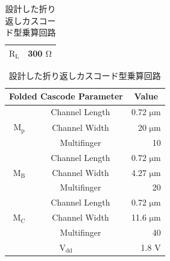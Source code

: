 \begin{table}[!b]
\begin{minipage}[t]{.45\textwidth}
\begin{center}
\begin{tabular}{c|c|r}
                        \multicolumn{2}{c|}{$\mathrm{R_{L}}$} &   300 $\mathrm{\Omega}$   \\
                        \hline
                    \end{tabular}
                \end{center}                
            \end{minipage}
            \hfill
            \begin{minipage}[t]{.45\textwidth}
                \begin{center}
                    \caption{設計した折り返しカスコード型乗算回路}
                    \label{table:3_folded_gilbert_param}
                    \begin{tabular}{c|c|r}
                            \hline
                            \multicolumn{2}{c|}{Folded Cascode Parameter}   & \multicolumn{1}{c}{Value}     \\
                            \hline\hline
                            &   Channel Length   &   0.72 $\mathrm{\mu m}$   \\
                            \cline{2-3}
                            $\mathrm{M_{p}}$   &   Channel Width   &   20 $\mathrm{\mu m}$   \\
                            \cline{2-3}
                                &   Multifinger   & 10    \\
                            \hline
                            &   Channel Length   &   0.72 $\mathrm{\mu m}$   \\
                            \cline{2-3}
                            $\mathrm{M_{B}}$   &   Channel Width   &   4.27 $\mathrm{\mu m}$   \\
                            \cline{2-3}
                                &   Multifinger   & 20    \\
                            \hline
                            &   Channel Length   &   0.72 $\mathrm{\mu m}$   \\
                            \cline{2-3}
                            $\mathrm{M_{C}}$   &   Channel Width   &   11.6 $\mathrm{\mu m}$   \\
                            \cline{2-3}
                                &   Multifinger   & 40    \\
                            \hline
                            \multicolumn{2}{c|}{$\mathrm{V_{dd}}$} &   1.8 $\mathrm{V}$   \\
                            \hline

\end{tabular}
\end{center}
\end{minipage}
\end{table}
